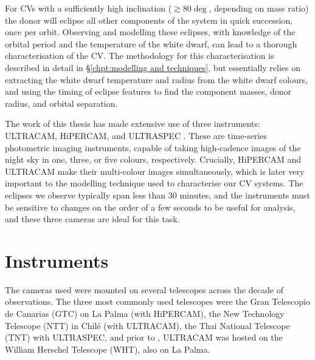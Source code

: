 
\label{chpt:observations and observational techniques} %



For CVs with a sufficiently high inclination ($\gtrsim 80 \deg$, depending on mass ratio) the donor will eclipse all other components of the system in quick succession, once per orbit. Observing and modelling these eclipses, with knowledge of the orbital period and the temperature of the white dwarf, can lead to a thorough characterisation of the CV. The methodology for this characterisation is described in detail in \S\ref{chpt:modelling and techniques}, but essentially relies on extracting the white dwarf temperature and radius from the white dwarf colours, and using the timing of eclipse features to find the component masses, donor radius, and orbital separation.

The work of this thesis has made extensive use of three instruments: ULTRACAM, HiPERCAM, and ULTRASPEC .
These are time-series photometric imaging instruments, capable of taking high-cadence images of the night sky in one, three, or five colours, respectively. Crucially, HiPERCAM and ULTRACAM make their multi-colour images simultaneously, which is later very important to the modelling technique used to characterise our CV systems. The eclipses we observe typically span less than 30 minutes, and the instruments must be sensitive to changes on the order of a few seconds to be useful for analysis, and these three cameras are ideal for this task.


\section{Instruments}

The cameras used were mounted on several telescopes across the decade of observations. The three most commonly used telescopes were the Gran Telescopio de Canarias (GTC) on La Palma (with HiPERCAM), the New Technology Telescope (NTT) in Chil\'e (with ULTRACAM), the Thai National Telescope (TNT) with ULTRASPEC, and prior to , ULTRACAM was hosted on the William Herschel Telescope (WHT), also on La Palma. 

